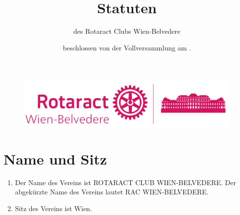 \documentclass{article}
\title{Statuten}
\author{des Rotaract Clubs Wien-Belvedere}
\date{beschlossen von der Vollversammlung am \DTMusedate{release}.}
\begin{document}
\begin{figure}[t]
    \centering
    \includegraphics[width=\linewidth]{Logo.pdf}
\end{figure}
\maketitle
\clearpage
\tableofcontents
\clearpage

\section{Name und Sitz}
\begin{enumerate}
    \item Der Name des Vereins ist ROTARACT CLUB WIEN-BELVEDERE. Der abgekürzte Name des Vereins lautet RAC WIEN-BELVEDERE.
    \item Sitz des Vereins ist Wien.
\end{enumerate}
\end{document}
